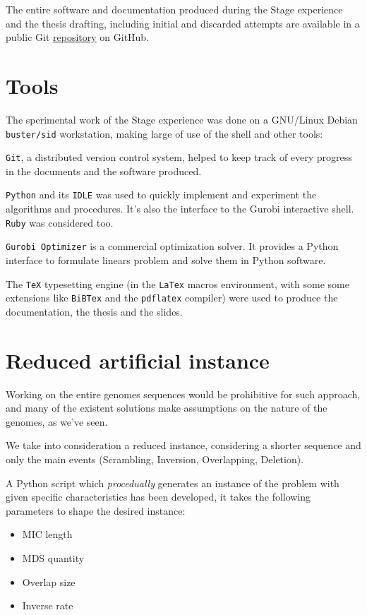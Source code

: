 The entire software and documentation produced during the Stage experience and the thesis drafting, including initial and discarded attempts are available in a public Git \href{https://github.com/avivace/dna-recombination}{repository} \cite{avivace_repo} on GitHub.

\section{Tools}
The sperimental work of the Stage experience was done on a GNU/Linux Debian \texttt{buster/sid} workstation, making large of use of the shell and other tools:

\texttt{Git}, a distributed version control system, helped to keep track of every progress in the documents and the software produced.

\texttt{Python} \cite{Rossum:1995:PRM:869369} and its \texttt{IDLE} was used to quickly implement and experiment the algorithms and procedures. It's also the interface to the Gurobi interactive shell. \texttt{Ruby} was considered too.

\texttt{Gurobi Optimizer} \cite{gurobi} is a commercial optimization solver. It provides a Python interface to formulate linears problem and solve them in Python software.

The \texttt{TeX} typesetting engine (in the \texttt{LaTex} macros environment, with some some extensions like \texttt{BiBTex} and the \texttt{pdflatex} compiler) were used to produce the documentation, the thesis and the slides.

\section{Reduced artificial instance}
\label{gen}

Working on the entire genomes sequences would be prohibitive for such approach, and many of the existent solutions make assumptions on the nature of the genomes, as we've seen.

We take into consideration a reduced instance, considering a shorter sequence and only the main events (Scrambling, Inversion, Overlapping, Deletion).

A Python script which \textit{procedually} generates an instance of the problem with given specific characteristics has been developed, it takes the following parameters to shape the desired instance:

\begin{itemize}
	\item MIC length
	\item MDS quantity
	\item Overlap size
	\item Inverse rate
\end{itemize}


